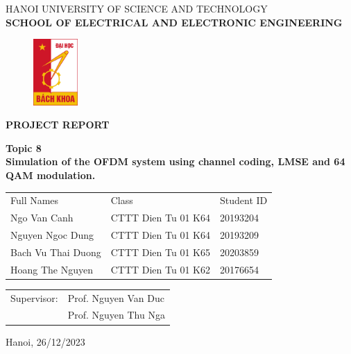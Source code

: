 \thispagestyle{empty}
\begin{center}
\vspace{-12pt} HANOI UNIVERSITY OF SCIENCE AND TECHNOLOGY \\
\textbf{\fontsize{14pt}{0pt}\selectfont SCHOOL OF ELECTRICAL AND ELECTRONIC ENGINEERING}
\vspace{1cm}
 \begin{figure}[H]
     \centering
     \includegraphics[width=0.15\textwidth]{Figures/logoBK.png}
 \end{figure}
\vspace{1cm}
\textbf{\fontsize{25pt}{0pt}\selectfont PROJECT REPORT}
\vspace{1cm}
\end{center}
\begin{center}
    \textbf{\fontsize{21pt}{0pt}\selectfont Topic 8 \\}
    \textbf{\fontsize{21pt}{0pt}\selectfont Simulation of the OFDM system using channel coding, LMSE and 64 QAM modulation. }
\vspace{7pt}
\begin{table}[H]
    \centering
    \begin{tabular}{l l l}
        Full Names          & Class                 & Student ID \\
        Ngo Van Canh        & CTTT Dien Tu 01 K64   & 20193204 \\
        Nguyen Ngoc Dung    & CTTT Dien Tu 01 K64   & 20193209 \\
        Bach Vu Thai Duong  & CTTT Dien Tu 01 K65   & 20203859 \\
        Hoang The Nguyen    & CTTT Dien Tu 01 K62   & 20176654 \\
    \end{tabular}
\end{table}
\vspace{1.5cm}
\begin{table}[H]
    \centering
    \begin{tabular}{l l}
        \fontsize{14pt}{0pt}\selectfont Supervisor: & Prof. Nguyen Van Duc \\
        {} & Prof. Nguyen Thu Nga \hspace{5pt} \\
    \end{tabular}
\end{table}
\vspace{1.5cm}
\fontsize{14pt}{0pt}\selectfont Hanoi, 26/12/2023
\end{center}

